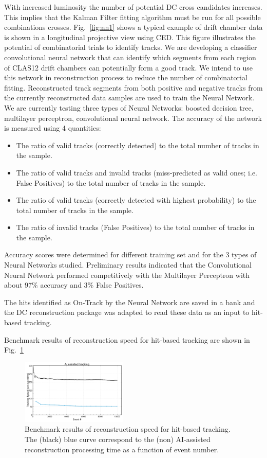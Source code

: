 With increased luminosity the number of potential DC cross candidates
increases.  This implies that the  Kalman Filter fitting algorithm must be run for all possible
combinations crosses.  Fig.~\ref{fig:nn1} shows a typical example of drift
chamber data is shown in a longitudinal projective view using CED. 
This figure illustrates the potential of combinatorial trials to identify tracks. 
We are developing a classifier convolutional neural network that can
identify which segments from each region of CLAS12 drift chambers can potentially form a
good track. We intend to use this network in reconstruction process to reduce the number of
combinatorial fitting.
Reconstructed track segments from both positive and negative tracks from the currently reconstructed data samples are used to train the Neural Network. 
We are currently testing three types of Neural Networks: boosted decision tree, multilayer perceptron, convolutional neural network.  
The accuracy of the network is measured using 4 quantities:
\begin{itemize}
\item{The ratio of valid tracks (correctly detected) to the total number of tracks in the sample. }
\item{The ratio of valid tracks and  invalid tracks (miss-predicted as valid ones; i.e. False Positives) to the total number of tracks in the sample. }
\item{The ratio of valid tracks (correctly detected with highest probability) to the total number of tracks in the sample. }
\item{The ratio of invalid tracks (False Positives) to the total number of tracks in the sample. }
\end{itemize}
Accuracy scores were determined for different training set and for the 3 types of Neural Networks studied.  Preliminary results indicated that the Convolutional Neural Network performed competitively with the Multilayer Perceptron with about 97\% accuracy and 3\% False Positives. 

The hits identified as On-Track by the Neural Network are saved in a bank and the DC reconstruction package was adapted to read these data as an input to hit-based tracking.

Benchmark results of reconstruction speed for hit-based tracking are shown in Fig.~\ref{fig:nn2}

\begin{figure}
\centering
\includegraphics[width=0.45\textwidth]{pics/nn2.png}
\caption{Benchmark results of reconstruction speed for hit-based tracking.  
The (black) blue curve correspond to the (non) AI-assisted reconstruction processing time as a function of event number. 
}
\label{fig:nn2}
\end{figure}

